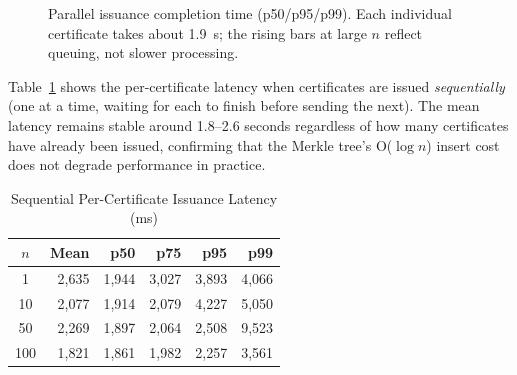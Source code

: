 \documentclass[journal]{IEEEtran}
\begin{document}
\begin{figure}[t]
\centering
{}
\caption{Parallel issuance completion time (p50/p95/p99). Each individual certificate takes about 1.9~s; the rising bars at large $n$ reflect queuing, not slower processing.}
\label{fig:issuance_perc}
\end{figure}

Table~\ref{tab:seq_issuance} shows the per-certificate latency when certificates are issued \emph{sequentially} (one at a time, waiting for each to finish before sending the next). The mean latency remains stable around 1.8--2.6 seconds regardless of how many certificates have already been issued, confirming that the Merkle tree's O($\log n$) insert cost does not degrade performance in practice.

\begin{table}[t]
\caption{Sequential Per-Certificate Issuance Latency (ms)}
\label{tab:seq_issuance}
\centering\small\renewcommand{\arraystretch}{1.1}
\begin{tabular}{@{}crrrrr@{}}
\toprule
\textbf{$n$} & \textbf{Mean} & \textbf{p50} & \textbf{p75} & \textbf{p95} & \textbf{p99} \\
\midrule
1   & 2{,}635 & 1{,}944 & 3{,}027 & 3{,}893 & 4{,}066 \\
10  & 2{,}077 & 1{,}914 & 2{,}079 & 4{,}227 & 5{,}050 \\
50  & 2{,}269 & 1{,}897 & 2{,}064 & 2{,}508 & 9{,}523 \\
100 & 1{,}821 & 1{,}861 & 1{,}982 & 2{,}257 & 3{,}561 \\
\bottomrule
\end{tabular}
\end{table}
\end{document}
